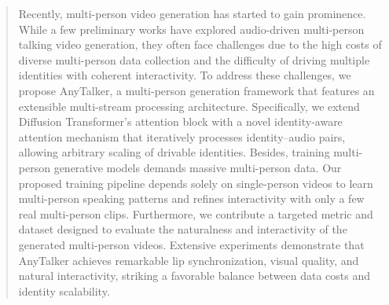 \begin{abstract}
Recently, multi-person video generation has started to gain prominence. 
While a few preliminary works have explored audio-driven multi-person talking video generation, they often face challenges due to the high costs of diverse multi-person data collection and the difficulty of driving multiple identities with coherent interactivity.
To address these challenges, we propose AnyTalker, a multi-person generation framework that features an extensible multi-stream processing architecture.
Specifically, we extend Diffusion Transformer's attention block with a novel identity-aware attention mechanism that iteratively processes identity–audio pairs, allowing arbitrary scaling of drivable identities.
Besides, training multi-person generative models demands massive multi-person data.
Our proposed training pipeline depends solely on single-person videos to learn multi-person speaking patterns and refines interactivity with only a few real multi-person clips.
Furthermore, we contribute a targeted metric and dataset designed to evaluate the naturalness and interactivity of the generated multi-person videos.
Extensive experiments demonstrate that AnyTalker achieves remarkable lip synchronization, visual quality, and natural interactivity, striking a favorable balance between data costs and identity scalability.
\end{abstract}
